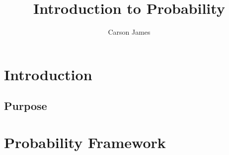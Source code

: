 \documentclass[12pt]{amsart}
\theoremstyle{definition}
\theoremstyle{remark}
\theoremstyle{definition}
\begin{document}
	
	\title{Introduction to Probability}
	\author{Carson James}
	\maketitle
	
	\tableofcontents
	
	\section{Introduction}
	
	\subsection{Purpose}
	
	\section{Probability Framework}
	
\end{document}

